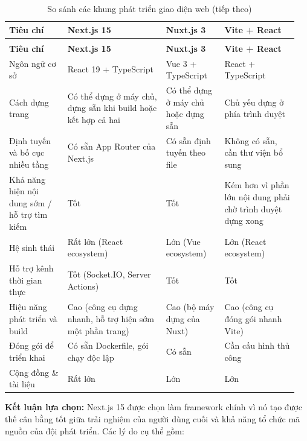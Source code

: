 \documentclass[a4paper]{extarticle}
\newcommand{\thesissettableid}[2]{%
  \renewcommand{\thetable}{#1}%
  \renewcommand{\theHtable}{#2}%
}
\begin{document}
{\thesissettableid{3.24}{tab-ch3-so-sanh-framework-frontend}
\def\LTcaptype{table}
\begin{longtable}{|L{0.195\linewidth}|L{0.323\linewidth}|L{0.192\linewidth}|L{0.244\linewidth}|}
\caption{So sánh các khung phát triển giao diện web}\label{tab:ch3-so-sanh-framework-frontend}\\
\hline \textbf{Tiêu chí} & \textbf{Next.js 15} & \textbf{Nuxt.js 3} & \textbf{Vite + React} \\
\hline
\endfirsthead
\caption[]{So sánh các khung phát triển giao diện web (tiếp theo)}\\
\hline \textbf{Tiêu chí} & \textbf{Next.js 15} & \textbf{Nuxt.js 3} & \textbf{Vite + React} \\
\hline
\endhead
\hline
\endfoot
\endlastfoot
Ngôn ngữ cơ sở & React 19 + TypeScript & Vue 3 + TypeScript & React +
TypeScript \\\hline
Cách dựng trang & Có thể dựng ở máy chủ, dựng sẵn khi build hoặc kết
hợp cả hai & Có thể dựng ở máy chủ hoặc dựng sẵn & Chủ yếu dựng ở phía
trình duyệt \\\hline
Định tuyến và bố cục nhiều tầng & Có sẵn App Router của Next.js & Có sẵn
định tuyến theo file & Không có sẵn, cần thư viện bổ sung \\\hline
Khả năng hiện nội dung sớm / hỗ trợ tìm kiếm & Tốt & Tốt & Kém hơn vì
phần lớn nội dung phải chờ trình duyệt dựng xong \\\hline
Hệ sinh thái & Rất lớn (React ecosystem) & Lớn (Vue ecosystem) & Lớn
(React ecosystem) \\\hline
Hỗ trợ kênh thời gian thực & Tốt (Socket.IO, Server Actions) & Tốt & Tốt \\\hline
Hiệu năng phát triển và build & Cao (công cụ dựng nhanh, hỗ trợ hiện sớm một phần trang) & Cao (bộ máy dựng của Nuxt) &
Cao (công cụ đóng gói nhanh Vite) \\\hline
Đóng gói để triển khai & Có sẵn Dockerfile, gói chạy độc lập & Có sẵn & Cần
cấu hình thủ công \\\hline
Cộng đồng \& tài liệu & Rất lớn & Lớn & Lớn \\\hline
\end{longtable}
}


\textbf{Kết luận lựa chọn:} Next.js 15 được chọn làm framework chính vì
nó tạo được thế cân bằng tốt giữa trải nghiệm của người dùng cuối và khả
năng tổ chức mã nguồn của đội phát triển. Các lý do cụ thể gồm:
\end{document}
